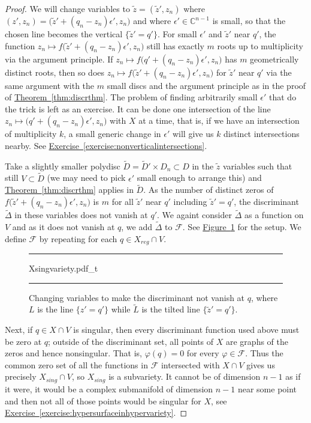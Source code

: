 \documentclass[12pt,openany]{book}
\newcommand{\C}{{\mathbb{C}}}
\newcommand{\sF}{{\mathscr{F}}}
\theoremstyle{plain}
\theoremstyle{remark}
\theoremstyle{definition}
\newenvironment{myfig}{%
\begin{figure}[h!t]
\noindent\rule{\textwidth}{0.5pt}\vspace{12pt}\par\centering}%
{\par\noindent\rule{\textwidth}{0.5pt}
\end{figure}}
\theoremstyle{exercise}
\theoremstyle{example}
\newcommand{\figureref}[1]{\hyperref[#1]{Figure~\ref*{#1}}}
\newcommand{\exerciseref}[1]{\hyperref[#1]{Exercise~\ref*{#1}}}
\newcommand{\thmref}[1]{\hyperref[#1]{Theorem~\ref*{#1}}}
\begin{document}
\begin{proof}
We will change variables to
$\tilde{z} = (\tilde{z}',z_n)$ where
$(z',z_n) = \bigl(\tilde{z}' + (q_n-z_n) \epsilon', z_n\bigr)$
and where $\epsilon' \in \C^{n-1}$ is small,
so that the chosen line becomes the vertical $\{ \tilde{z}' = q' \}$.
For small $\epsilon'$ and $\tilde{z}'$ near $q'$, the function
$z_n \mapsto f\bigl(\tilde{z}' + (q_n-z_n) \epsilon', z_n\bigr)$
still has exactly $m$ roots up to
multiplicity via the argument principle.
If $z_n \mapsto f\bigl(q' + (q_n-z_n) \epsilon', z_n\bigr)$ has $m$ geometrically
distinct roots, then so does 
$z_n \mapsto f\bigl(\tilde{z}' + (q_n-z_n) \epsilon', z_n\bigr)$
for $\tilde{z}'$ near $q'$
via the same argument with the $m$ small discs and
the argument principle as in the proof of \thmref{thm:discrthm}.
The problem of finding arbitrarily small $\epsilon'$ that do the trick is
left as an exercise.  It can be done one intersection of the line
$z_n \mapsto \bigl(q' + (q_n-z_n) \epsilon', z_n\bigr)$ with $X$ at a time,
that is, if we have an intersection of multiplicity $k$, a small generic change in
$\epsilon'$ will give us $k$ distinct intersections nearby.
See \exerciseref{exercise:nonverticalintersections}.

Take a slightly smaller polydisc
$\widetilde{D} = \widetilde{D}' \times D_n \subset D$
in the $\tilde{z}$ variables
such that
still $V \subset \widetilde{D}$ (we may need to pick $\epsilon'$ small
enough to arrange this)
and \thmref{thm:discrthm} applies in $\widetilde{D}$.
As the number
of distinct zeros of $f\bigl(\tilde{z}' + (q_n-z_n) \epsilon', z_n\bigr)$ is $m$
for all $\tilde{z}'$ near $q'$ including $\tilde{z}'=q'$,
the discriminant
$\widetilde{\Delta}$ in these variables does not vanish at $q'$.
We againt consider $\widetilde{\Delta}$ as a function
on $V$ and as it does not vanish at $q$, we add $\widetilde{\Delta}$ to $\sF$.
See \figureref{fig:Xsingvariety} for the setup.
We define $\sF$ by repeating for each
$q \in X_{\mathit{reg}} \cap V$.

\begin{myfig}
\medskip
{Xsingvariety.pdf_t}
\bigskip
\caption{Changing variables to make the discriminant not vanish at
$q$, where $L$ is the line $\{z' = q'\}$ while $\widetilde{L}$
is the tilted line $\{ \tilde{z}' = q' \}$.\label{fig:Xsingvariety}}
\end{myfig}

Next, if $q \in X \cap V$ is singular, then every discriminant function
used above must be zero at $q$;
outside of the discriminant set, all points of $X$ are graphs of the zeros and hence nonsingular.
That is, $\varphi(q)=0$ for every $\varphi \in \sF$.
Thus the common zero set of all the functions in $\sF$ intersected with
$X \cap V$ gives us precisely $X_{\textit{sing}} \cap V$, so
$X_{\textit{sing}}$ is a subvariety.  It cannot be of dimension $n-1$ as
if it were,
it would be a complex submanifold of dimension $n-1$ near some
point and then not all of those points would be singular for $X$,
see \exerciseref{exercise:hypersurfaceinhypervariety}.
\end{proof}
\end{document}
